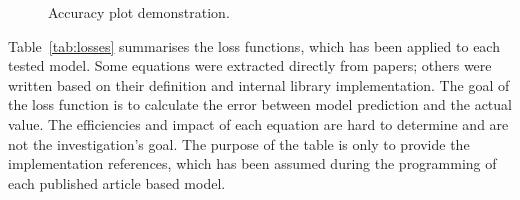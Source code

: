 {%
%
\begin{figure}[ht]
    \centering
    
    \caption{Accuracy plot demonstration.}
    \label{fig:plot_demo}
\end{figure}
\mbox{Table~\ref{tab:losses}} summarises the loss functions, which has been applied to each tested model.
Some equations were extracted directly from papers; others were written based on their definition and internal library implementation.
The goal of the loss function is to calculate the error between model prediction and the actual value.
The efficiencies and impact of each equation are hard to determine and are not the investigation's goal.
The purpose of the table is only to provide the implementation references, which has been assumed during the programming of each published article based model.
\begin{table}[htbp]
    \renewcommand{\arraystretch}{1.3}
    \caption{Model's loss functions}
    \centering
    \label{tab:losses}
\end{table}

}
